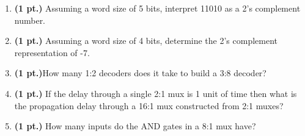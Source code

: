 \documentclass{article}
\begin{document}
\begin{enumerate}

\item {\bf (1 pt.)} Assuming a word size of 5 bits, interpret 11010 as a 2's complement
number.

\item {\bf (1 pt.)} Assuming a word size of 4 bits, determine the 2's complement
representation of -7.

\item {\bf (1 pt.)}How many 1:2 decoders does it take to build a 3:8 decoder?


\item {\bf (1 pt.)} If the delay through a single 2:1 mux is 1 unit of time then
what is the propagation delay through a 16:1 mux constructed from 2:1 muxes?

\item {\bf (1 pt.)} How many inputs do the AND gates in a 8:1 mux have?


\end{enumerate}
\end{document}
